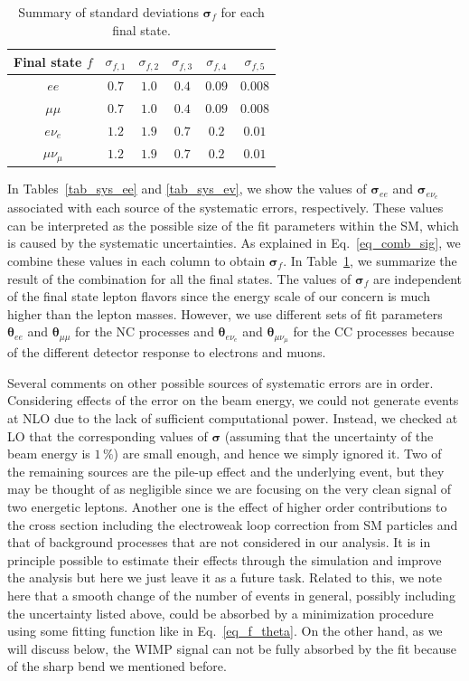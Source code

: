 \documentclass[12pt,twoside,book]{article}
\begin{document}
\begin{table}[t]
  \centering
  \begin{tabular}{c|ccccc}
    Final state $f$ & $\sigma_{f,1}$ & $\sigma_{f,2}$ & $\sigma_{f,3}$ & $\sigma_{f,4}$ & $\sigma_{f,5}$ \\ \hline
    $ee$ & $0.7$ & $1.0$ & $0.4$ & $0.09$ & $0.008$ \\
    $\mu\mu$ & $0.7$ & $1.0$ & $0.4$ & $0.09$ & $0.008$ \\
    $e\nu_e$ & $1.2$ & $1.9$ & $0.7$ & $0.2$ & $0.01$ \\
    $\mu\nu_\mu$ & $1.2$ & $1.9$ & $0.7$ & $0.2$ & $0.01$ \\
  \end{tabular}
  \caption{
    Summary of standard deviations $\bm{\sigma}_f$ for each final state.
  }
  \label{tab_sys}
\end{table}

In Tables~\ref{tab_sys_ee} and \ref{tab_sys_ev}, we show the values of $\bm{\sigma}_{ee}$ and $\bm{\sigma}_{e\nu_e}$ associated with each source of the systematic errors, respectively.
These values can be interpreted as the possible size of the fit parameters within the SM, which is caused by the systematic uncertainties.
As explained in Eq.~\eqref{eq_comb_sig}, we combine these values in each column to obtain $\bm{\sigma}_f$.
In Table~\ref{tab_sys}, we summarize the result of the combination for all the final states.
The values of $\bm{\sigma}_f$ are independent of the final state lepton flavors since the energy scale of our concern is much higher than the lepton masses.
However, we use different sets of fit parameters $\bm{\theta}_{ee}$ and $\bm{\theta}_{\mu\mu}$ for the NC processes and $\bm{\theta}_{e\nu_e}$ and $\bm{\theta}_{\mu\nu_\mu}$ for the CC processes because of the different detector response to electrons and muons.

Several comments on other possible sources of systematic errors are in order.
Considering effects of the error on the beam energy, we could not generate events at NLO due to the lack of sufficient computational power.
Instead, we checked at LO that the corresponding values of $\bm{\sigma}$ (assuming that the uncertainty of the beam energy is $1\,\%$) are small enough, and hence we simply ignored it.
Two of the remaining sources are the pile-up effect and the underlying event, but they may be thought of as negligible since we are focusing on the very clean signal of two energetic leptons.
Another one is the effect of higher order contributions to the cross section including the electroweak loop correction from SM particles and that of background processes that are not considered in our analysis.
It is in principle possible to estimate their effects through the simulation and improve the analysis but here we just leave it as a future task.
Related to this, we note here that a smooth change of the number of events in general, possibly including the uncertainty listed above, could be absorbed by a minimization procedure using some fitting function like in Eq.~\eqref{eq_f_theta}.
On the other hand, as we will discuss below, the WIMP signal can not be fully absorbed by the fit because of the sharp bend we mentioned before.
\end{document}

